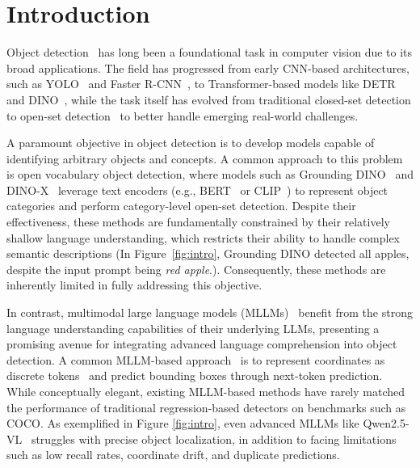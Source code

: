 \section{Introduction}
\label{sec:intro}

Object detection~\cite{girshick2015fast, ren2016faster, redmon2016you, redmon2018yolov3, carion2020end, zhang2022dino, tian2019fcos, liu2016ssd, liu2022dab, zhao2024detrs, khanam2024yolov11, tan2020efficientdet, duan2019centernet} has long been a foundational task in computer vision due to its broad applications. The field has progressed from early CNN-based architectures, such as YOLO~\cite{redmon2016you} and Faster R-CNN~\cite{ren2016faster}, to Transformer-based models like DETR~\cite{carion2020end} and DINO~\cite{zhang2022dino}, while the task itself has evolved from traditional closed-set detection to open-set detection~\cite{liu2023grounding, li2022grounded, jiang2024t, cheng2024yolo, minderer2023scaling, ren2024dino, VLP:MDETR, minderer2022simple, minderer2023scaling} to better handle emerging real-world challenges.

A paramount objective in object detection is to develop models capable of identifying arbitrary objects and concepts. A common approach to this problem is open vocabulary object detection, where models such as Grounding DINO~\cite{liu2023grounding} and DINO-X~\cite{ren2024dino} leverage text encoders (e.g., BERT~\cite{devlin2018bert} or CLIP~\cite{radford2021clip}) to represent object categories and perform category-level open-set detection. Despite their effectiveness, these methods are fundamentally constrained by their relatively shallow language understanding, which restricts their ability to handle complex semantic descriptions (In Figure~\ref{fig:intro}, Grounding DINO detected all apples, despite the input prompt being \textit{red apple}.). Consequently, these methods are inherently limited in fully addressing this objective.

In contrast, multimodal large language models (MLLMs)~\cite{gpt4v,  VLM:Gemini, lu2025ovis2, wang2025internvl3, chen2022pali, agrawal2024pixtral, li2024aria, deitke2024molmo, wang2024qwen2} benefit from the strong language understanding capabilities of their underlying LLMs, presenting a promising avenue for integrating advanced language comprehension into object detection. A common MLLM-based approach~\cite{chen2023shikra, you2023ferret, wang2023cogvlm, zhan2025griffon, zhang2024ferret, jiang2024chatrex, ma2024groma, jiang2025referringperson, zhu2025internvl3, guo2025seed1, bai2025qwen2} is to represent coordinates as discrete tokens~\cite{chen2021pix2seq} and predict bounding boxes through next-token prediction. While conceptually elegant, existing MLLM-based methods have rarely matched the performance of traditional regression-based detectors on benchmarks such as COCO. As exemplified in Figure \ref{fig:intro}, even advanced MLLMs like Qwen2.5-VL~\cite{bai2025qwen2} struggles with precise object localization, in addition to facing limitations such as low recall rates, coordinate drift, and duplicate predictions.

